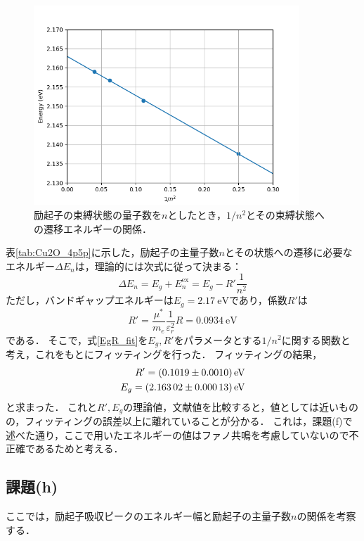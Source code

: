 \documentclass[titlepage]{jsarticle}
\begin{document}
\begin{figure}[htbp]
  \centering
  \includegraphics[width=10cm]{excitons.png}
  \caption{励起子の束縛状態の量子数を$n$としたとき，$1/n^2$とその束縛状態への遷移エネルギーの関係．}
  \label{fig:excitons}
\end{figure}

表\ref{tab:Cu2O_4p5p}に示した，励起子の主量子数$n$とその状態への遷移に必要なエネルギー$\Delta E_n$は，理論的には次式に従って決まる：
\begin{equation}
  \Delta E_n = E_g + E_n^{\mathrm{ex}} = E_g - R'\frac{1}{n^2} \label{EgR_fit}
\end{equation}
ただし，バンドギャップエネルギーは$E_g = \SI{2.17}{\eV}$であり，係数$R'$は
\begin{equation}
  R' = \frac{\mu^*}{m_e}\frac{1}{\varepsilon_r^2} R = \SI{0.0934}{\eV}
\end{equation}
である．
そこで，式\eqref{EgR_fit}を$E_g,R'$をパラメータとする$1/n^2$に関する関数と考え，これをもとにフィッティングを行った．
フィッティングの結果，
\begin{align}
  R' = \SI[separate-uncertainty]{0.1019 \pm 0.0010}{\eV} \\
  E_g = \SI[separate-uncertainty]{ 2.16302 \pm 0.00013}{\eV}
\end{align}
と求まった．
これと$R',E_g$の理論値，文献値を比較すると，値としては近いものの，フィッティングの誤差以上に離れていることが分かる．
これは，課題(f)で述べた通り，ここで用いたエネルギーの値はファノ共鳴を考慮していないので不正確であるためと考える．

\subsection{課題(h)}

ここでは，励起子吸収ピークのエネルギー幅と励起子の主量子数$n$の関係を考察する．
\end{document}
